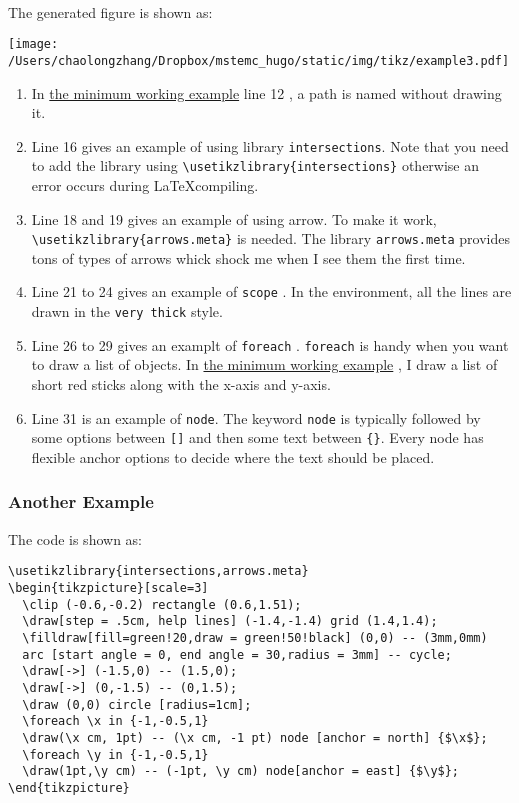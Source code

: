 \hspace{0pt}\\
The generated figure is shown as:
\begin{center}
\texttt{[image: /Users/chaolongzhang/Dropbox/mstemc\_hugo/static/img/tikz/example3.pdf]}
\end{center}

\begin{enumerate}
\item In \hyperref[a-minimum-working-example]{the minimum working example} line 12 , a path is named  without drawing
it.
\item Line 16 gives an example of using library \texttt{intersections}. Note
that you need to add the library using \texttt{\textbackslash{}usetikzlibrary\{intersections\}}
otherwise an error occurs during \LaTeX compiling.
\item Line 18 and 19 gives an example of using arrow. To make it work,
\texttt{\textbackslash{}usetikzlibrary\{arrows.meta\}} is needed. The library \texttt{arrows.meta} provides tons
of types of arrows whick shock me when I see them the first time.
\item Line 21 to 24 gives an example of \texttt{scope} . In the environment, all
the lines are drawn in the \texttt{very thick} style.
\item Line 26 to 29 gives an examplt of \texttt{foreach} . \texttt{foreach} is handy
when you want to draw a list of objects. In \hyperref[a-minimum-working-example]{the minimum working example} , I
draw a list of short red sticks along with the x-axis and y-axis.
\item Line 31 is an example of \texttt{node}. The keyword \texttt{node} is typically followed by
some options between \texttt{[]} and then some text between \texttt{\{\}}. Every node has flexible
anchor options to decide where the text should be placed.
\end{enumerate}
\subsubsection{Another Example}
\label{sec:org85bdcaf}


The code is shown as:
\begin{lstlisting}
\usetikzlibrary{intersections,arrows.meta}
\begin{tikzpicture}[scale=3]
  \clip (-0.6,-0.2) rectangle (0.6,1.51);
  \draw[step = .5cm, help lines] (-1.4,-1.4) grid (1.4,1.4);
  \filldraw[fill=green!20,draw = green!50!black] (0,0) -- (3mm,0mm)
  arc [start angle = 0, end angle = 30,radius = 3mm] -- cycle;
  \draw[->] (-1.5,0) -- (1.5,0);
  \draw[->] (0,-1.5) -- (0,1.5);
  \draw (0,0) circle [radius=1cm];
  \foreach \x in {-1,-0.5,1}
  \draw(\x cm, 1pt) -- (\x cm, -1 pt) node [anchor = north] {$\x$};
  \foreach \y in {-1,-0.5,1}
  \draw(1pt,\y cm) -- (-1pt, \y cm) node[anchor = east] {$\y$};
\end{tikzpicture}
\end{lstlisting}

